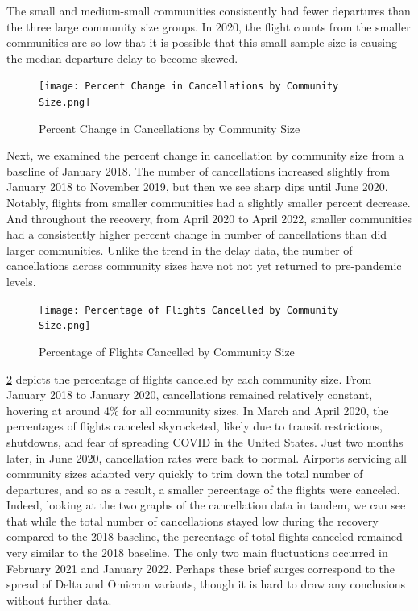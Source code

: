 \documentclass[11pt]{article}
\begin{document}
The small and medium-small communities consistently had fewer departures than the three large community size groups. In 2020, the flight counts from the smaller communities are so low that it is possible that this small sample size is causing the median departure delay to become skewed. 


\begin{figure}[htbp!]
\centerline{\texttt{[image: Percent Change in Cancellations by Community Size.png]}}
  \label{Percent Change in Cancellations by Community Size}
  \caption{Percent Change in Cancellations by Community Size}
\end{figure}
Next, we examined the percent change in cancellation by community size from a baseline of January 2018. The number of cancellations increased slightly from January 2018 to November 2019, but then we see sharp dips until June 2020. Notably, flights from smaller communities had a slightly smaller percent decrease. And throughout the recovery, from April 2020 to April 2022, smaller communities had a consistently higher percent change in number of cancellations than did larger communities. Unlike the trend in the delay data, the number of cancellations across community sizes have not not yet returned to pre-pandemic levels. \newline



\begin{figure}[htbp!]
\centerline{\texttt{[image: Percentage of Flights Cancelled by Community Size.png]}}
  \label{Percentage of Flights Cancelled by Community Size}
    \caption{Percentage of Flights Cancelled by Community Size}
\end{figure}
\cref{Percentage of Flights Cancelled by Community Size} depicts the percentage of flights canceled by each community size. From January 2018 to January 2020, cancellations remained relatively constant, hovering at around 4\% for all community sizes. In March and April 2020, the percentages of flights canceled skyrocketed, likely due to transit restrictions, shutdowns, and fear of spreading COVID in the United States. Just two months later, in June 2020, cancellation rates were back to normal. Airports servicing all community sizes adapted very quickly to trim down the total number of departures, and so as a result, a smaller percentage of the flights were canceled. Indeed, looking at the two graphs of the cancellation data in tandem, we can see that while the total number of cancellations stayed low during the recovery compared to the 2018 baseline, the percentage of total flights canceled remained very similar to the 2018 baseline. The only two main fluctuations occurred in February 2021 and January 2022. Perhaps these brief surges correspond to the spread of Delta and Omicron variants, though it is hard to draw any conclusions without further data. \newline
\end{document}
